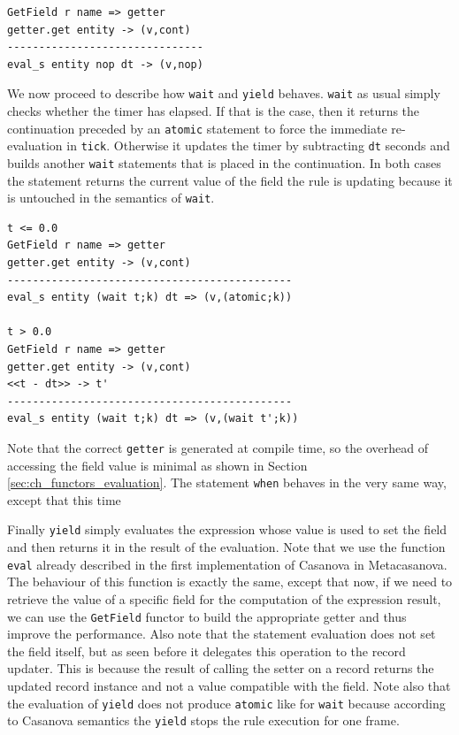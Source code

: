 \begin{lstlisting}
GetField r name => getter
getter.get entity -> (v,cont)
-------------------------------
eval_s entity nop dt -> (v,nop)
\end{lstlisting}

We now proceed to describe how \texttt{wait} and \texttt{yield} behaves. \texttt{wait} as usual simply checks whether the timer has elapsed. If that is the case, then it returns the continuation preceded by an \texttt{atomic} statement to force the immediate re-evaluation in \texttt{tick}. Otherwise it updates the timer by subtracting \texttt{dt} seconds and builds another \texttt{wait} statements that is placed in the continuation. In both cases the statement returns the current value of the field the rule is updating because it is untouched in the semantics of \texttt{wait}.

\begin{lstlisting}
t <= 0.0
GetField r name => getter
getter.get entity -> (v,cont)
---------------------------------------------
eval_s entity (wait t;k) dt => (v,(atomic;k))

t > 0.0
GetField r name => getter
getter.get entity -> (v,cont)
<<t - dt>> -> t'
---------------------------------------------
eval_s entity (wait t;k) dt => (v,(wait t';k))
\end{lstlisting}

\noindent
Note that the correct \texttt{getter} is generated at compile time, so the overhead of accessing the field value is minimal as shown in Section \ref{sec:ch_functors_evaluation}. The statement \texttt{when} behaves in the very same way, except that this time 


Finally \texttt{yield} simply evaluates the expression whose value is used to set the field and then returns it in the result of the evaluation. Note that we use the function \texttt{eval} already described in the first implementation of Casanova in Metacasanova. The behaviour of this function is exactly the same, except that now, if we need to retrieve the value of a specific field for the computation of the expression result, we can use the \texttt{GetField} functor to build the appropriate getter and thus improve the performance. Also note that the statement evaluation does not set the field itself, but as seen before it delegates this operation to the record updater. This is because the result of calling the setter on a record returns the updated record instance and not a value compatible with the field. Note also that the evaluation of \texttt{yield} does not produce \texttt{atomic} like for \texttt{wait} because according to Casanova semantics the \texttt{yield} stops the rule execution for one frame.

